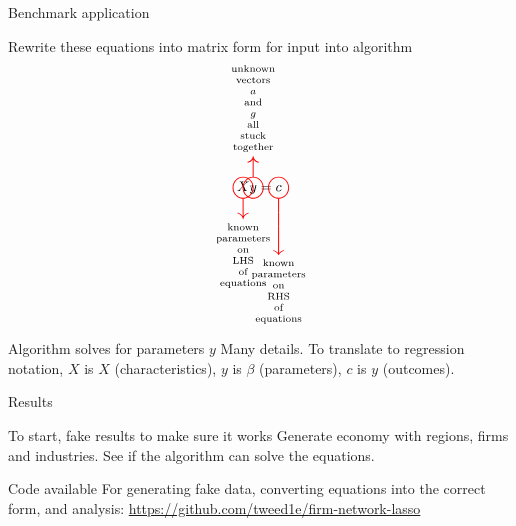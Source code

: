 \documentclass[12pt]{beamer}
\def\calloutsymbigarrow{%
  \ensurestackMath{%
  \scalebox{1.7}{\color{red}\stackunder[0pt]{\bigcirc}{\bigg\downarrow}}}%
}
\newcommand\callouttextbigarrow[1]{%
  \def\stacktype{S}\renewcommand\useanchorwidth{T}\stackText%
  \stackunder{\calloutsymbigarrow}{\scriptsize\Longstack{#1}}\stackMath%
}
\newcommand\calloutbigarrow[3][2.5pt]{%
  \def\stacktype{L}\stackMath\stackunder[#1]{#2}{\callouttextbigarrow{#3}}%
}
\def\calloutsym{%
  \ensurestackMath{%
  \scalebox{1.7}{\color{red}\stackunder[0pt]{\bigcirc}{\downarrow}}}%
}
\newcommand\callouttext[1]{%
  \def\stacktype{S}\renewcommand\useanchorwidth{T}\stackText%
  \stackunder{\calloutsym}{\scriptsize\Longstack{#1}}\stackMath%
}
\newcommand\callout[3][1.5pt]{%
  \def\stacktype{L}\stackMath\stackunder[#1]{#2}{\callouttext{#3}}%
}
\def\calloutsymon{%
  \ensurestackMath{%
  \scalebox{1.7}{\color{red}\stackon[0pt]{\bigcirc}{\uparrow}}}%
}
\newcommand\callouttexton[1]{%
  \def\stacktype{S}\renewcommand\useanchorwidth{T}\stackText%
  \stackon{\calloutsymon}{\scriptsize\Longstack{#1}}\stackMath%
}
\newcommand\callouton[3][1.5pt]{%
  \def\stacktype{L}\stackMath\stackunder[#1]{#2}{\callouttexton{#3}}%
}
\begin{document}
\begin{frame}{Benchmark application}

\begin{block}{Rewrite these equations into matrix form for input into algorithm}
\begin{equation}
\callout[1.8pt]{X}{known parameters on\\ LHS of equations} \callouton[1.8pt]{y}{unknown vectors $a$ and $g$ all stuck together}=\calloutbigarrow[1.8pt]{c}{known parameters \\on RHS of equations}
\end{equation}
\end{block}

\begin{block}{Algorithm solves for parameters $y$}
Many details. To translate to regression notation, $X$ is $X$ (characteristics), $y$ is $\beta$ (parameters), $c$ is $y$ (outcomes). %
\end{block}

\end{frame}





\begin{frame}{Results}

\begin{block}{To start, fake results to make sure it works}
Generate economy with regions, firms and industries. See if the algorithm can solve the equations.
\end{block}

\begin{block}{Code available}
For generating fake data, converting equations into the correct form, and analysis:
\url{https://github.com/tweed1e/firm-network-lasso}
\end{block}

\end{frame}
\end{document}
